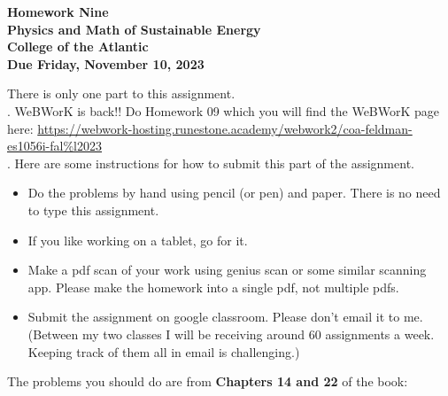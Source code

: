 \documentclass[12pt]{article}
\begin{document}
\pagestyle{empty}
 
\begin{center}
{\LARGE {\bf Homework Nine}}\\
\bigskip
{\Large {\bf Physics and Math of Sustainable Energy}}\\
\bigskip
{\Large {\bf College of the Atlantic}}\\
\bigskip
{ {\bf Due Friday, November 10, 2023}}\\ 
\end{center}
\medskip


\noindent There is only one part to this assignment.\\

.
WeBWorK is back!! Do Homework 09 which you will find the WeBWorK page here:
\url{https://webwork-hosting.runestone.academy/webwork2/coa-feldman-es1056i-fal%l2023} \\


.  Here are some
instructions for how to submit this part of the assignment.
\begin{itemize}
\item Do the problems by hand using pencil (or pen) and paper.
  There is no need to type this assignment.
\item If you like working on a tablet, go for it. 
\item Make a pdf scan of your work using genius scan or some
  similar scanning app.  Please make the homework into a single
  pdf, not multiple pdfs.
\item Submit the assignment on google classroom.  Please don't
  email it to me.  (Between my two classes I will be receiving
  around 60 assignments a week.  Keeping track of them all in email 
  is challenging.)\\
\end{itemize}



\noindent The problems you should do are from {\bf Chapters 14 and 22} 
of the book:  \\  

\end{document}
